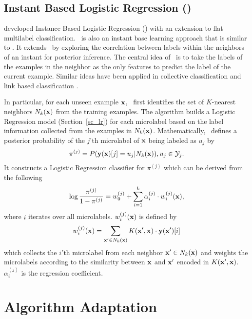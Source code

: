 {%
%
\subsection{Instant Based Logistic Regression (\iblr)} \label{sc_iblr}

\citet{Cheng09combining} developed Instance Based Logistic Regression (\iblr) with an extension to flat multilabel classification.
\iblr\ is also an instant base learning approach \citep{Aha91instance} that is similar to \mlknn.
It extends \mlknn\ by exploring the correlation between labels within the neighbors of an instant for posterior inference.
The central idea of \iblr\ is to take the labels of the examples in the neighbor as the only features to predict the label of the current example.
Similar ideas have been applied in collective classification \citep{Ghamrawi05collective} and link based classification \citep{Getoor05link, Getoor07introduction}.

In particular, for each unseen example $\mathbf {x}$, \iblr\ first identifies the set of $K$-nearest neighbors $N_k(\mathbf {x})$ from the training examples.
The algorithm builds a Logistic Regression model (Section~\ref{sc_lr}) for each microlabel based on the label information collected from the examples in $N_k(\mathbf {x})$.
Mathematically, \iblr\ defines a posterior probability of the $j$'th microlabel of $\mathbf {x}$ being labeled as $u_j$ by
\begin{align*}
	\pi^{(j)} = P( \mathbf {y}(\mathbf {x})[j]=u_j | N_k(\mathbf {x})), u_j\in\mathcal{Y}_j.
\end{align*}
It constructs a Logistic Regression classifier for $\pi^{(j)}$ which can be derived from the following 
\begin{align*}
	\log\frac{\pi^{(j)}}{1-\pi^{(j)}} = w_0^{(j)} + \sum_{i=1}^{k}\alpha_i^{(j)}\cdot w_{i}^{(j)}(\mathbf {x}),
\end{align*}
where $i$ iterates over all microlabels.
$w_i^{(j)}(\mathbf {x})$ is defined by 
\begin{align*}
	w_i^{(j)}(\mathbf {x}) = \sum_{\mathbf {x}'\in N_k(\mathbf {x})}K(\mathbf {x}',\mathbf {x})\cdot \mathbf {y}(\mathbf {x}')[i]
\end{align*}
which collects the $i'$th microlabel from each neighbor $\mathbf {x}'\in N_k(\mathbf {x})$ and weights the microlabels according to the similarity between $\mathbf {x}$ and $\mathbf {x}'$ encoded in $K(\mathbf {x}',\mathbf {x})$.
$\alpha_i^{(j)}$ is the regression coefficient.



%
%
\section{Algorithm Adaptation}

}
